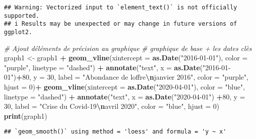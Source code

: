 \documentclass[
]{article}
\newenvironment{Shaded}{\begin{snugshade}}{\end{snugshade}}
\newcommand{\AttributeTok}[1]{\textcolor[rgb]{0.13,0.29,0.53}{#1}}
\newcommand{\CommentTok}[1]{\textcolor[rgb]{0.56,0.35,0.01}{\textit{#1}}}
\newcommand{\DecValTok}[1]{\textcolor[rgb]{0.00,0.00,0.81}{#1}}
\newcommand{\FunctionTok}[1]{\textcolor[rgb]{0.13,0.29,0.53}{\textbf{#1}}}
\newcommand{\NormalTok}[1]{#1}
\newcommand{\OtherTok}[1]{\textcolor[rgb]{0.56,0.35,0.01}{#1}}
\newcommand{\SpecialCharTok}[1]{\textcolor[rgb]{0.81,0.36,0.00}{\textbf{#1}}}
\newcommand{\StringTok}[1]{\textcolor[rgb]{0.31,0.60,0.02}{#1}}
\begin{document}
\begin{verbatim}
## Warning: Vectorized input to `element_text()` is not officially supported.
## i Results may be unexpected or may change in future versions of ggplot2.
\end{verbatim}

\begin{Shaded}
\begin{Highlighting}[]
\CommentTok{\# Ajout d\textquotesingle{}éléments de précision au graphique}
\CommentTok{\# graphique de base + les dates clès}
\NormalTok{graph1 }\OtherTok{\textless{}{-}}\NormalTok{ graph1 }\SpecialCharTok{+} 
  \FunctionTok{geom\_vline}\NormalTok{(}\AttributeTok{xintercept =} \FunctionTok{as.Date}\NormalTok{(}\StringTok{"2016{-}01{-}01"}\NormalTok{),}
             \AttributeTok{color =} \StringTok{"purple"}\NormalTok{,}
             \AttributeTok{linetype =} \StringTok{"dashed"}\NormalTok{) }\SpecialCharTok{+} 
  \FunctionTok{annotate}\NormalTok{(}\StringTok{"text"}\NormalTok{,}
           \AttributeTok{x =} \FunctionTok{as.Date}\NormalTok{(}\StringTok{"2016{-}01{-}01"}\NormalTok{)}\SpecialCharTok{+}\DecValTok{80}\NormalTok{,}
           \AttributeTok{y =} \DecValTok{30}\NormalTok{, }
           \AttributeTok{label =} \StringTok{"Abondance de l\textquotesingle{}offre}\SpecialCharTok{\textbackslash{}n}\StringTok{janvier 2016"}\NormalTok{, }
           \AttributeTok{color =} \StringTok{"purple"}\NormalTok{, }
           \AttributeTok{hjust =} \DecValTok{0}\NormalTok{)}\SpecialCharTok{+} 
  \FunctionTok{geom\_vline}\NormalTok{(}\AttributeTok{xintercept =} \FunctionTok{as.Date}\NormalTok{(}\StringTok{"2020{-}04{-}01"}\NormalTok{),}
             \AttributeTok{color =} \StringTok{"blue"}\NormalTok{, }
             \AttributeTok{linetype =} \StringTok{"dashed"}\NormalTok{) }\SpecialCharTok{+} 
  \FunctionTok{annotate}\NormalTok{(}\StringTok{"text"}\NormalTok{, }
           \AttributeTok{x =} \FunctionTok{as.Date}\NormalTok{(}\StringTok{"2020{-}04{-}01"}\NormalTok{) }\SpecialCharTok{+}\DecValTok{80}\NormalTok{, }
           \AttributeTok{y =} \DecValTok{30}\NormalTok{, }\AttributeTok{label =} \StringTok{"Crise du Covid{-}19}\SpecialCharTok{\textbackslash{}n}\StringTok{avril 2020"}\NormalTok{, }
           \AttributeTok{color =} \StringTok{"blue"}\NormalTok{, }
           \AttributeTok{hjust =} \DecValTok{0}\NormalTok{)}
\FunctionTok{print}\NormalTok{(graph1)}
\end{Highlighting}
\end{Shaded}

\begin{verbatim}
## `geom_smooth()` using method = 'loess' and formula = 'y ~ x'
\end{verbatim}
\end{document}
